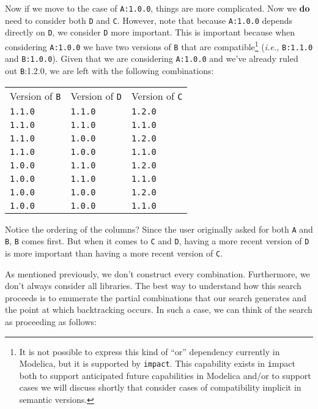 \documentclass[11pt,a4paper,twocolumn]{article}
\renewcommand{\small}{\fontsize{9.5pt}{11.1pt}\selectfont}
\newcommand{\code}[1]{\texttt{#1}} %
\begin{document}
Now if we move to the case of \code{A:1.0.0}, things are more
complicated.  Now we \textbf{do} need to consider both \code{D} and
\code{C}.  However, note that because \code{A:1.0.0} depends
directly on \code{D}, we consider \code{D} more important.  This is
important because when considering \code{A:1.0.0} we have two
versions of \code{B} that are compatible\footnote{It is not possible
  to express this kind of ``or'' dependency currently in Modelica, but
  it is supported by \code{impact}.  This capability exists in {\code
    impact} both to support anticipated future capabilities in
  Modelica \cite{} and/or to support cases we will discuss shortly
  that consider cases of compatibility implicit in semantic versions.}
(\emph{i.e.,} \code{B:1.1.0} and \code{B:1.0.0}).  Given that we are
considering \code{A:1.0.0} and we've already ruled out {\code
  B:1.2.0}, we are left with the following combinations:
{\small
\begin{center}
\begin{tabular}{ l l l }
  Version of \code{B} & Version of \code{D} & Version of \code{C} \\
  \code{1.1.0} & \code{1.1.0} & \code{1.2.0} \\
  \code{1.1.0} & \code{1.1.0} & \code{1.1.0} \\
  \code{1.1.0} & \code{1.0.0} & \code{1.2.0} \\
  \code{1.1.0} & \code{1.0.0} & \code{1.1.0} \\
  \code{1.0.0} & \code{1.1.0} & \code{1.2.0} \\
  \code{1.0.0} & \code{1.1.0} & \code{1.1.0} \\
  \code{1.0.0} & \code{1.0.0} & \code{1.2.0} \\
  \code{1.0.0} & \code{1.0.0} & \code{1.1.0} \\
\end{tabular}
\end{center}
}
Notice the ordering of the columns?  Since the user originally asked
for both \code{A} and \code{B}, \code{B} comes first.  But when it
comes to \code{C} and \code{D}, having a more recent version of
\code{D} is more important than having a more recent version of
\code{C}.

As mentioned previously, we don't construct every combination.
Furthermore, we don't always consider all libraries.  The best way to
understand how this search proceeds is to enumerate the partial
combinations that our search generates and the point at which
backtracking occurs.  In such a case, we can think of the search as
proceeding as follows:
\end{document}
